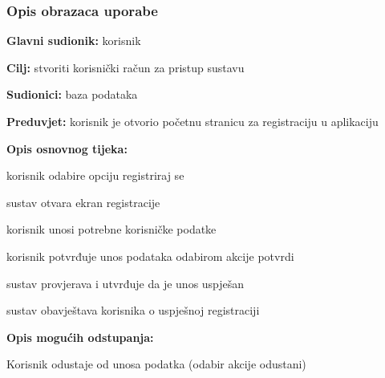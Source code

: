 				
				\subsubsection{Opis obrazaca uporabe}
					

					\noindent {}
					\begin{packed_item}
	
						\item \textbf{Glavni sudionik: }korisnik
						\item  \textbf{Cilj:} stvoriti korisnički račun za pristup sustavu
						\item  \textbf{Sudionici:} baza podataka
						\item  \textbf{Preduvjet:} korisnik je otvorio početnu stranicu za registraciju u aplikaciju
						\item  \textbf{Opis osnovnog tijeka:}
						
						\item[] \begin{packed_enum}
							\item korisnik odabire opciju registriraj se
							\item sustav otvara ekran registracije
							\item korisnik unosi potrebne korisničke podatke
							\item korisnik potvrđuje unos podataka odabirom akcije potvrdi
							\item sustav provjerava i utvrđuje da je unos uspješan
							\item sustav obavještava korisnika o uspješnoj registraciji

						\end{packed_enum}
						
						\item  \textbf{Opis mogućih odstupanja:}
						
						\item[] \begin{packed_item}
							\item[4.a] Korisnik odustaje od unosa podatka (odabir akcije odustani)
							\item[] \begin{packed_enum}
								

\end{packed_enum}
\end{packed_item}
\end{packed_item}
